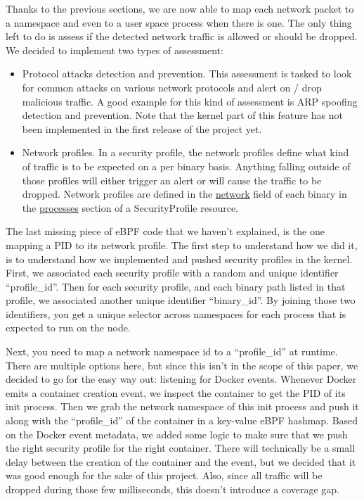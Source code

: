 Thanks to the previous sections, we are now able to map each network packet to a namespace and even to a user space process when there is one. The only thing left to do is assess if the detected network traffic is allowed or should be dropped. We decided to implement two types of assessment:
\begin{itemize}
  \item Protocol attacks detection and prevention. This assessment is tasked to look for common attacks on various network protocols and alert on / drop malicious traffic. A good example for this kind of assessment is ARP spoofing detection and prevention. Note that the kernel part of this feature has not been implemented in the first release of the project yet.
  \item Network profiles. In a security profile, the network profiles define what kind of traffic is to be expected on a per binary basis. Anything falling outside of those profiles will either trigger an alert or will cause the traffic to be dropped. Network profiles are defined in the \url{network} field of each binary in the \url{processes} section of a SecurityProfile resource.
\end{itemize}

The last missing piece of eBPF code that we haven’t explained, is the one mapping a PID to its network profile. The first step to understand how we did it, is to understand how we implemented and pushed security profiles in the kernel. First, we associated each security profile with a random and unique identifier “profile\_id”. Then for each security profile, and each binary path listed in that profile, we associated another unique identifier “binary\_id”. By joining those two identifiers, you get a unique selector across namespaces for each process that is expected to run on the node.

Next, you need to map a network namespace id to a “profile\_id” at runtime. There are multiple options here, but since this isn’t in the scope of this paper, we decided to go for the easy way out: listening for Docker events. Whenever Docker emits a container creation event, we inspect the container to get the PID of its init process. Then we grab the network namespace of this init process and push it along with the “profile\_id” of the container in a key-value eBPF hashmap. Based on the Docker event metadata, we added some logic to make sure that we push the right security profile for the right container. There will technically be a small delay between the creation of the container and the event, but we decided that it was good enough for the sake of this project. Also, since all traffic will be dropped during those few milliseconds, this doesn’t introduce a coverage gap.

